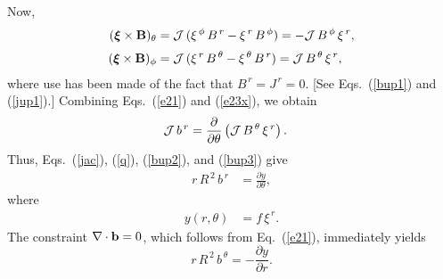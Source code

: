 \documentclass[12pt,prb,aps,notitlepage]{revtex4-1}
\newcommand {\bxi}{\mbox{\boldmath$\xi$}}
\begin{document}
Now, 
\begin{align}
(\bxi\times {\bf B})_\theta&= {\cal J}\,(\xi^{\,\phi}\,B^{\,r} - \xi^{\,r}\,B^{\,\phi}) = -{\cal J}\,B^{\,\phi}\,\xi^{\,r},\\[0.5ex]
(\bxi\times {\bf B})_\phi &= {\cal J}\,(\xi^{\,r}\,B^{\,\theta} - \xi^{\,\theta}\,B^{\,r})= {\cal J}\,B^{\,\theta}\,\xi^{\,r},\label{e23x}
\end{align}
where use has been made of  the fact that $B^{\,r}=J^{\,r}=0$. [See Eqs.~(\ref{bup1}) and (\ref{jup1}).]
 Combining Eqs.~(\ref{e21}) and (\ref{e23x}), we obtain
\begin{align}
{\cal J}\,b^{\,r} &= \frac{\partial}{\partial\theta}\left({\cal J}\,B^{\,\theta}\,\xi^{\,r}\right).
\end{align}
Thus, Eqs.~(\ref{jac}), (\ref{q}), (\ref{bup2}), and (\ref{bup3}) give
\begin{align}\label{e41}
r\,R^{\,2}\,b^{\,r}& = \frac{\partial y}{\partial\theta},
\end{align}
where 
\begin{align}\label{e42}
y(r,\theta) &=f\,\xi^{\,r}.
\end{align}
The constraint $\nabla\cdot{\bf b} =0$, which follows from Eq.~(\ref{e21}),  immediately yields
\begin{equation}\label{e43y}
r\,R^{\,2}\,b^{\,\theta} = - \frac{\partial y}{\partial r}.
\end{equation}
\end{document}
